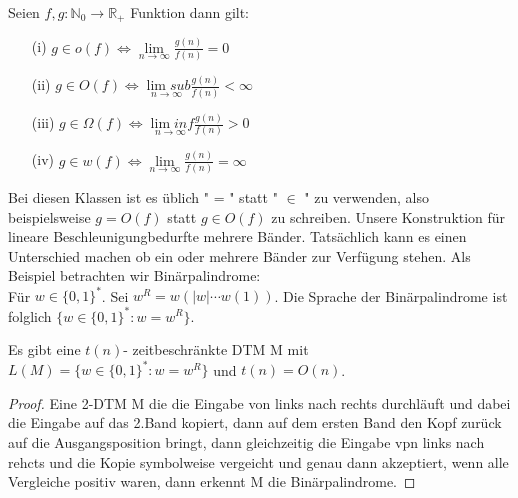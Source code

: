     Seien \(f, g : \mathbb{N}_0 \to \mathbb{R}_+\) Funktion dann gilt: 
    \begin{itemize}
        \item [(i)] \(g \in o(f) \Leftrightarrow \underset{n \to \infty}{\lim} \frac{g(n)}{f(n)} = 0\)
        \item [(ii)] \(g \in O(f) \Leftrightarrow \underset{n \to \infty}{\lim sub} \frac{g(n)}{f(n)} < \infty\)
        \item [(iii)] \(g \in \Omega(f) \Leftrightarrow \underset{n \to \infty}{\lim inf} \frac{g(n)}{f(n)} > 0\)
        \item [(iv)]\(g \in w(f) \Leftrightarrow \underset{n \to \infty}{\lim} \frac{g(n)}{f(n)} = \infty\)
    \end{itemize}
    Bei diesen Klassen ist es üblich " = " statt " \(\in\) " zu verwenden, also beispielsweise \(g = O(f)\) statt \(g \in O(f)\) zu schreiben.
    \medskip
    Unsere Konstruktion für lineare Beschleunigungbedurfte mehrere Bänder. Tatsächlich kann es einen Unterschied machen ob ein oder mehrere Bänder zur Verfügung stehen. Als Beispiel betrachten wir Binärpalindrome:\\ Für \(w \in \{0, 1\}^*\). Sei \(w^R = w(|w| \cdots w(1))\). Die Sprache der Binärpalindrome ist folglich \(\{w \in \{0, 1\}^* : w = w^R \}\).

    Es gibt eine \(t(n)\)- zeitbeschränkte DTM M mit \(L(M) = \{w \in \{0, 1\}^* : w = w^R\}\) und \(t(n) = O(n)\).
    \begin{proof}
        Eine 2-DTM M die die Eingabe von links nach rechts durchläuft und dabei die Eingabe auf das 2.Band kopiert, dann auf dem ersten Band den Kopf zurück auf die Ausgangsposition bringt, dann gleichzeitig die Eingabe vpn links nach rehcts und die Kopie symbolweise vergeicht und genau dann akzeptiert, wenn alle Vergleiche positiv waren, dann erkennt M die Binärpalindrome.
    \end{proof}

